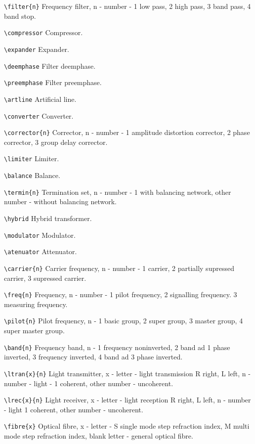\noindent
\verb?\filter{n}?
Frequency filter, n - number - 1 low pass, 2 high pass, 3
band pass, 4 band stop.

\noindent
\verb?\compressor?
Compressor.


\noindent
\verb?\expander?
Expander.

\noindent
\verb?\deemphase?
Filter deemphase.

\noindent
\verb?\preemphase?
Filter preemphase.


\noindent
\verb?\artline?
Artificial line.

\noindent
\verb?\converter?
Converter.

\noindent
\verb?\corrector{n}?
Corrector, n - number - 1 amplitude distortion corrector,
2 phase corrector, 3 group delay corrector.

\noindent
\verb?\limiter?
Limiter.

\noindent
\verb?\balance?
Balance.

\noindent
\verb?\termin{n}?
Termination set, n - number - 1 with balancing network,
other number - without balancing network.

\noindent
\verb?\hybrid?
Hybrid transformer.

\noindent
\verb?\modulator?
Modulator.


\noindent
\verb?\atenuator?
Attenuator.


\noindent
\verb?\carrier{n}?
Carrier frequency, n - number - 1 carrier,
2 partially supressed carrier, 3 supressed carrier.


\noindent
\verb?\freq{n}?
Frequency, n - number - 1 pilot frequency,
2 signalling frequency. 3 measuring frequency.

\noindent
\verb?\pilot{n}?
Pilot frequency, n - 1 basic group, 2 super group,
3 master group, 4 super master group.

\noindent
\verb?\band{n}?
Frequency band, n - 1 frequency noninverted, 2 band ad 1
phase inverted, 3 frequency inverted, 4 band ad 3 phase
inverted.


\noindent
\verb?\ltran{x}{n}?
Light transmitter, x - letter - light transmission
R right, L left, n - number - light - 1 coherent,
other number - uncoherent.


\noindent
\verb?\lrec{x}{n}?
Light receiver, x - letter - light reception
R right, L left, n - number - light 1 coherent,
other number - uncoherent.


\noindent
\verb?\fibre{x}?
Optical fibre, x - letter - S single mode step refraction index,
M multi mode step refraction index, blank letter -
general optical fibre.

